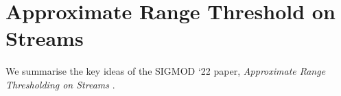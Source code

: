 \documentclass{article}
\begin{document}
\hspace{95mm}

\section*{Approximate Range Threshold on Streams}

We summarise the key ideas of the SIGMOD `22 paper, \textit{Approximate Range Thresholding on Streams} \cite{approxRTS}.  

\newpage

\end{document}
